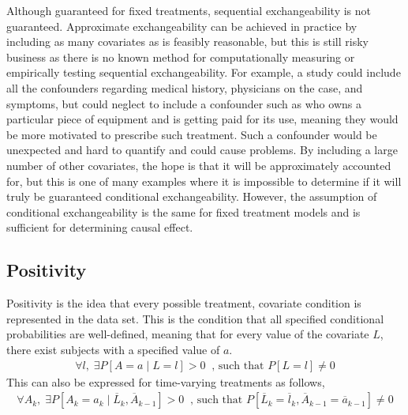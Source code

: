 Although guaranteed for fixed treatments, sequential exchangeability is not guaranteed.\cite{wright2015international}  Approximate exchangeability can be achieved in practice by including as many covariates as is feasibly reasonable, but this is still risky business as there is no known method for computationally measuring or empirically testing sequential exchangeability.  For example, a study could include all the confounders regarding medical history, physicians on the case, and symptoms, but could neglect to include a confounder such as who owns a particular piece of equipment and is getting paid for its use, meaning they would be more motivated to prescribe such treatment.  Such a confounder would be unexpected and hard to quantify and could cause problems.  By including a large number of other covariates, the hope is that it will be approximately accounted for, but this is one of many examples where it is impossible to determine if it will truly be guaranteed conditional exchangeability.  However, the assumption of conditional exchangeability is the same for fixed treatment models and is sufficient for determining causal effect. 


      
\subsection{Positivity} 
Positivity is the idea that every possible treatment, covariate condition is represented in the data set.  This is the condition that all specified conditional probabilities are well-defined, meaning that for every value of the covariate $L$, there exist subjects with a specified value of $a$.\cite{hernan2006estimating} 
\begin{align}
\forall l, \;  \exists P[A=a \mid L=l] > 0 \;\;  \text{, such that } P[L=l] \neq 0
\end{align} 
This can also be expressed for time-varying treatments as follows, 
\begin{align} 
\forall A_k, \; \exists P[A_k = a_k \mid \overline{L}_{k}, \overline{A}_{k-1}] > 0 \;\;   \text{, such that } P[\overline{L}_k = \overline{l}_k, \overline{A}_{k-1} = \overline{a}_{k-1} ] \neq 0
\end{align} 




